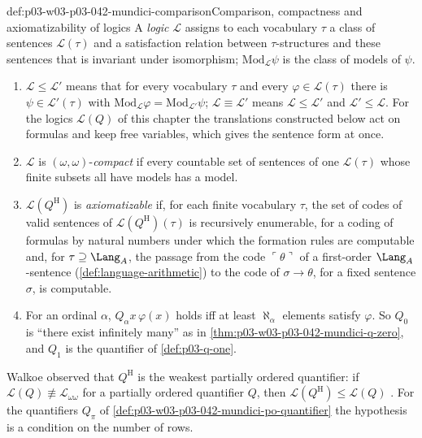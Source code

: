 \begin{hbconvention}{def:p03-w03-p03-042-mundici-comparison}{Comparison, compactness and axiomatizability of logics}
A \emph{logic} \(\mathscr L\) assigns to each vocabulary \(\tau\) a class
of sentences \(\mathscr L(\tau)\) and a satisfaction relation between
\(\tau\)-structures and these sentences that is invariant under
isomorphism; \(\mathrm{Mod}_{\mathscr L}\psi\) is the class of models of
\(\psi\).
\begin{enumerate}
\item \(\mathscr L\leq\mathscr L'\) means that for every vocabulary
      \(\tau\) and every \(\varphi\in\mathscr L(\tau)\) there is
      \(\psi\in\mathscr L'(\tau)\) with \(\mathrm{Mod}_{\mathscr
      L}\varphi=\mathrm{Mod}_{\mathscr L'}\psi\); \(\mathscr
      L\equiv\mathscr L'\) means \(\mathscr L\leq\mathscr L'\) and
      \(\mathscr L'\leq\mathscr L\).  For the logics \(\mathscr L(Q)\) of
      this chapter the translations constructed below act on formulas and
      keep free variables, which gives the sentence form at once.
\item \(\mathscr L\) is \((\omega,\omega)\)-\emph{compact} if every
      countable set of sentences of one \(\mathscr L(\tau)\) whose finite
      subsets all have models has a model.
\item \(\mathscr L(Q^{\mathrm H})\) is \emph{axiomatizable} if, for each
      finite vocabulary \(\tau\), the set of codes of valid sentences of
      \(\mathscr L(Q^{\mathrm H})(\tau)\) is recursively enumerable, for a
      coding of formulas by natural numbers under which the formation
      rules are computable and, for \(\tau\supseteq\Lang_A\), the passage
      from the code \(\ulcorner\theta\urcorner\) of a first-order
      \(\Lang_A\)-sentence (\cref{def:language-arithmetic}) to the code of
      \(\sigma\to\theta\), for a fixed sentence \(\sigma\), is computable.
\item For an ordinal \(\alpha\), \(Q_\alpha x\,\varphi(x)\) holds iff at
      least \(\aleph_\alpha\) elements satisfy \(\varphi\).  So \(Q_0\) is
      ``there exist infinitely many'' as in
      \cref{thm:p03-w03-p03-042-mundici-q-zero}, and \(Q_1\) is the
      quantifier of \cref{def:p03-q-one}.
\end{enumerate}
\end{hbconvention}

Walkoe observed that \(Q^{\mathrm H}\) is the weakest partially ordered
quantifier: if \(\mathscr L(Q)\not\equiv\mathscr L_{\omega\omega}\) for a
partially ordered quantifier \(Q\), then \(\mathscr L(Q^{\mathrm
H})\leq\mathscr L(Q)\) \cite[p.~213]{Mundici1985OtherQuantifiers}.  For
the quantifiers \(Q_\pi\) of \cref{def:p03-w03-p03-042-mundici-po-quantifier}
the hypothesis is a condition on the number of rows.

